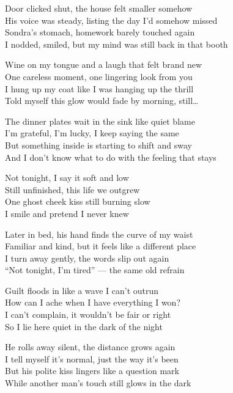 \begin{lyrics}

Door clicked shut, the house felt smaller somehow\\
His voice was steady, listing the day I’d somehow missed\\
Sondra’s stomach, homework barely touched again\\
I nodded, smiled, but my mind was still back in that booth

Wine on my tongue and a laugh that felt brand new\\
One careless moment, one lingering look from you\\
I hung up my coat like I was hanging up the thrill\\
Told myself this glow would fade by morning, still…

The dinner plates wait in the sink like quiet blame\\
I’m grateful, I’m lucky, I keep saying the same\\
But something inside is starting to shift and sway\\
And I don’t know what to do with the feeling that stays

Not tonight, I say it soft and low\\
Still unfinished, this life we outgrew\\
One ghost cheek kiss still burning slow\\
I smile and pretend I never knew

Later in bed, his hand finds the curve of my waist\\
Familiar and kind, but it feels like a different place\\
I turn away gently, the words slip out again\\
“Not tonight, I’m tired” — the same old refrain

Guilt floods in like a wave I can’t outrun\\
How can I ache when I have everything I won?\\
I can’t complain, it wouldn’t be fair or right\\
So I lie here quiet in the dark of the night

He rolls away silent, the distance grows again\\
I tell myself it’s normal, just the way it’s been\\
But his polite kiss lingers like a question mark\\
While another man’s touch still glows in the dark


\end{lyrics}
